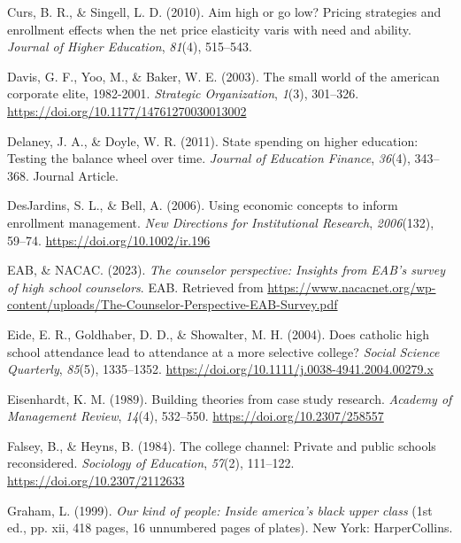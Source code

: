 \documentclass[
  12pt,
]{article}
\newlength{\cslhangindent}
\newlength{\cslentryspacingunit} %
\newenvironment{CSLReferences}[2] %
 {%
  \setlength{\parindent}{0pt}
  \ifodd #1
  \let\oldpar\par
  \def\par{\hangindent=\cslhangindent\oldpar}
  \fi
  \setlength{\parskip}{#2\cslentryspacingunit}
 }%
 {}
\begin{document}
\begin{CSLReferences}{1}{0}
\leavevmode{}%
Curs, B. R., \& Singell, L. D. (2010). Aim high or go low? Pricing strategies and enrollment effects when the net price elasticity varis with need and ability. \emph{Journal of Higher Education}, \emph{81}(4), 515--543.

\leavevmode{}%
Davis, G. F., Yoo, M., \& Baker, W. E. (2003). The small world of the american corporate elite, 1982-2001. \emph{Strategic Organization}, \emph{1}(3), 301--326. \url{https://doi.org/10.1177/14761270030013002}

\leavevmode{}%
Delaney, J. A., \& Doyle, W. R. (2011). State spending on higher education: Testing the balance wheel over time. \emph{Journal of Education Finance}, \emph{36}(4), 343--368. Journal Article.

\leavevmode{}%
DesJardins, S. L., \& Bell, A. (2006). Using economic concepts to inform enrollment management. \emph{New Directions for Institutional Research}, \emph{2006}(132), 59--74. \url{https://doi.org/10.1002/ir.196}

\leavevmode{}%
EAB, \& NACAC. (2023). \emph{The counselor perspective: Insights from EAB's survey of high school counselors}. EAB. Retrieved from \url{https://www.nacacnet.org/wp-content/uploads/The-Counselor-Perspective-EAB-Survey.pdf}

\leavevmode{}%
Eide, E. R., Goldhaber, D. D., \& Showalter, M. H. (2004). Does catholic high school attendance lead to attendance at a more selective college? \emph{Social Science Quarterly}, \emph{85}(5), 1335--1352. \url{https://doi.org/10.1111/j.0038-4941.2004.00279.x}

\leavevmode{}%
Eisenhardt, K. M. (1989). Building theories from case study research. \emph{Academy of Management Review}, \emph{14}(4), 532--550. \url{https://doi.org/10.2307/258557}

\leavevmode{}%
Falsey, B., \& Heyns, B. (1984). The college channel: Private and public schools reconsidered. \emph{Sociology of Education}, \emph{57}(2), 111--122. \url{https://doi.org/10.2307/2112633}

\leavevmode{}%
Graham, L. (1999). \emph{Our kind of people: Inside america's black upper class} (1st ed., pp. xii, 418 pages, 16 unnumbered pages of plates). New York: HarperCollins.


\end{CSLReferences}
\end{document}
